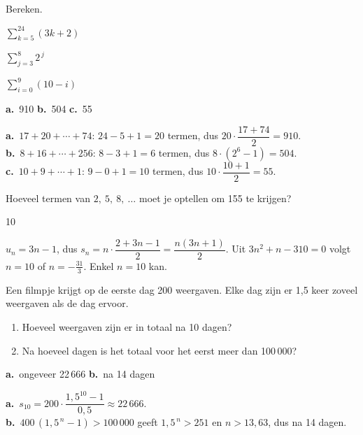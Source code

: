\begin{oefeningen}
\begin{oefening}[2]\label{oef:h3-somindex}
Bereken.
\begin{reeks}
  \item $\displaystyle\sum_{k=5}^{24} (3k + 2)$
  \item $\displaystyle\sum_{j=3}^{8} 2^{\,j}$
  \item $\displaystyle\sum_{i=0}^{9} (10 - i)$
\end{reeks}
\begin{solution}
\textbf{a.}~910 \quad \textbf{b.}~504 \quad \textbf{c.}~55
\end{solution}
\begin{fullsolution}
\textbf{a.}~$17+20+\cdots+74$: $24-5+1=20$ termen, dus $20\cdot\dfrac{17+74}{2}=910$.\\
\textbf{b.}~$8+16+\cdots+256$: $8-3+1=6$ termen, dus $8\cdot(2^6-1)=504$.\\
\textbf{c.}~$10+9+\cdots+1$: $9-0+1=10$ termen, dus $10\cdot\dfrac{10+1}{2}=55$.
\end{fullsolution}
\end{oefening}

\begin{oefening}[2]\label{oef:h3-nuitsom}
Hoeveel termen van $2,\ 5,\ 8,\ \ldots$ moet je optellen om 155 te krijgen?
\begin{solution}
10
\end{solution}
\begin{fullsolution}
$u_n=3n-1$, dus $s_n=n\cdot\dfrac{2+3n-1}{2}=\dfrac{n(3n+1)}{2}$. Uit $3n^2+n-310=0$ volgt $n=10$ of $n=-\tfrac{31}{3}$. Enkel $n=10$ kan.
\end{fullsolution}
\end{oefening}

\begin{oefening}[2]\label{oef:h3-mrcontext}
Een filmpje krijgt op de eerste dag 200 weergaven. Elke dag zijn er 1,5 keer zoveel weergaven als de dag ervoor.
\begin{enumerate}
  \item Hoeveel weergaven zijn er in totaal na 10 dagen?
  \item Na hoeveel dagen is het totaal voor het eerst meer dan 100\,000?
\end{enumerate}
\begin{solution}
\textbf{a.}~ongeveer 22\,666 \quad \textbf{b.}~na 14 dagen
\end{solution}
\begin{fullsolution}
\textbf{a.}~$s_{10}=200\cdot\dfrac{1{,}5^{10}-1}{0{,}5}\approx 22\,666$.\\
\textbf{b.}~$400\,(1{,}5^{\,n}-1)>100\,000$ geeft $1{,}5^{\,n}>251$ en $n>13{,}63$, dus na 14 dagen.
\end{fullsolution}
\end{oefening}


\end{oefeningen}
